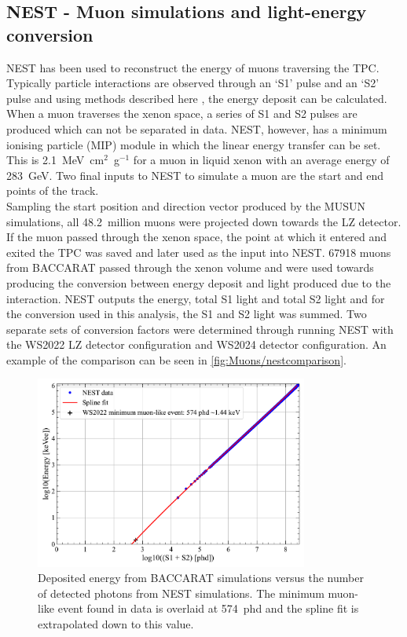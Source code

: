 \subsection{NEST - Muon simulations and light-energy conversion}\label{sec:Muons/MuonFluxNEST}
NEST has been used to reconstruct the energy of muons traversing the TPC. Typically particle interactions are observed through an `S1' pulse and an `S2' pulse and using methods described here \cite{NEST1}, the energy deposit can be calculated. When a muon traverses the xenon space, a series of S1 and S2 pulses are produced which can not be separated in data. NEST, however, has a minimum ionising particle (MIP) module in which the linear energy transfer can be set. This is 2.1~MeV~cm$^2$~g$^{-1}$\cite{MUE} for a muon in liquid xenon with an average energy of 283~GeV. Two final inputs to NEST to simulate a muon are the start and end points of the track.\\
Sampling the start position and direction vector produced by the MUSUN simulations, all 48.2~million muons were projected down towards the LZ detector. If the muon passed through the xenon space, the point at which it entered and exited the TPC was saved and later used as the input into NEST. 67918 muons from BACCARAT passed through the xenon volume and were used towards producing the conversion between energy deposit and light produced due to the interaction. NEST outputs the energy, total S1 light and total S2 light and for the conversion used in this analysis, the S1 and S2 light was summed.
Two separate sets of conversion factors were determined through running NEST with the WS2022 LZ detector configuration and WS2024 detector configuration. An example of the comparison can be seen in \autoref{fig:Muons/nestcomparison}.
\begin{figure}[htbp]
    \centering
    \includegraphics[width=0.8\textwidth]{figures/Muons/TPCEnergyConversion.pdf}
    \caption{Deposited energy from BACCARAT simulations versus the number of detected photons from NEST simulations. The minimum muon-like event found in data is overlaid at 574~phd and the spline fit is extrapolated down to this value.}
    \label{fig:Muons/nestcomparison}
\end{figure}
